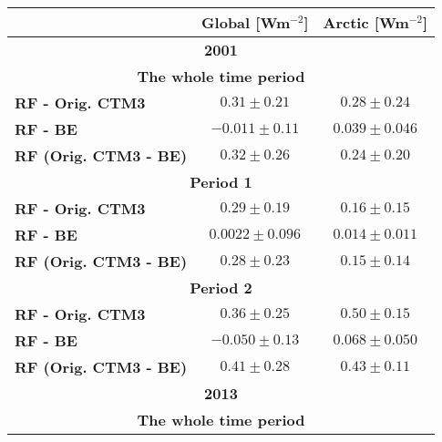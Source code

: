 \begin{table}[h]
\centering
\begin{tabular}{|l|l|l|}
\hline
\textbf{}                     & \textbf{Global {[}Wm$^{-2}${]}}       & \textbf{Arctic {[}Wm$^{-2}${]}}      \\ \hline
\multicolumn{3}{|c|}{\textbf{2001}}                                                                          \\ \hline
\multicolumn{3}{|c|}{\textbf{The whole time period}}                                                         \\ \hline
\textbf{RF - Orig. CTM3}      & \multicolumn{1}{c|}{$0.31\pm0.21$}    & \multicolumn{1}{c|}{$0.28\pm0.24$}   \\
\textbf{RF - BE}              & \multicolumn{1}{c|}{$-0.011\pm0.11$}  & \multicolumn{1}{c|}{$0.039\pm0.046$} \\
\textbf{RF (Orig. CTM3 - BE)} & \multicolumn{1}{c|}{$0.32\pm0.26$}    & \multicolumn{1}{c|}{$0.24\pm0.20$}   \\ \hline
\multicolumn{3}{|c|}{\textbf{Period 1}}                                                                      \\ \hline
\textbf{RF - Orig. CTM3}      & \multicolumn{1}{c|}{$0.29\pm0.19$}    & \multicolumn{1}{c|}{$0.16\pm0.15$}   \\
\textbf{RF - BE}              & \multicolumn{1}{c|}{$0.0022\pm0.096$} & \multicolumn{1}{c|}{$0.014\pm0.011$} \\
\textbf{RF (Orig. CTM3 - BE)} & \multicolumn{1}{c|}{$0.28\pm0.23$}    & \multicolumn{1}{c|}{$0.15\pm0.14$}   \\ \hline
\multicolumn{3}{|c|}{\textbf{Period 2}}                                                                      \\ \hline
\textbf{RF - Orig. CTM3}      & \multicolumn{1}{c|}{$0.36\pm0.25$}    & \multicolumn{1}{c|}{$0.50\pm0.15$}   \\
\textbf{RF - BE}              & \multicolumn{1}{c|}{$-0.050\pm0.13$}  & \multicolumn{1}{c|}{$0.068\pm0.050$} \\
\textbf{RF (Orig. CTM3 - BE)} & \multicolumn{1}{c|}{$0.41\pm0.28$}    & \multicolumn{1}{c|}{$0.43\pm0.11$}   \\ \hline
\multicolumn{3}{|c|}{\textbf{2013}}                                                                          \\ \hline
\multicolumn{3}{|c|}{\textbf{The whole time period}}                                                         \\ \hline

\end{tabular}
\end{table}
